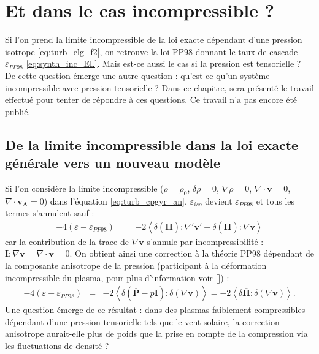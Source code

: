 \chapter{Et dans le cas incompressible ? }
\renewcommand\partie{\Partie\ Chapitre \thechapter}
\label{ch-22}

\bigskip
\minitoc  

Si l'on prend la limite incompressible de la loi exacte dépendant d'une pression isotrope \eqref{eq:turb_elg_f2}, on retrouve la loi \acs{PP98} donnant le taux de cascade $\varepsilon_{PP98}$ \eqref{eq:synth_inc_EL}. Mais est-ce aussi le cas si la pression est tensorielle ? De cette question émerge une autre question : qu'est-ce qu'un système incompressible avec pression tensorielle ? Dans ce chapitre, sera présenté le travail effectué pour tenter de répondre à ces questions. Ce travail n'a pas encore été publié. 

\section{De la limite incompressible dans la loi exacte générale vers un nouveau modèle }
\label{sec-221}

Si l'on considère la limite incompressible ($\rho = \rho_0$, $\delta \rho = 0$, $\nabla \rho=0$, $\nabla \cdot \boldsymbol{v}=0$, $\nabla \cdot \boldsymbol{v_A}=0$) dans l'équation \eqref{eq:turb_cpgyr_an}, $\varepsilon_{iso}$ devient $\varepsilon_{PP98}$ et tous les termes s'annulent sauf : 
\begin{eqnarray}
\label{eq:turb_cpinc_an} 
- 4(\varepsilon - \varepsilon_{PP98}) &=& -2 \left< \delta (\overline{\boldsymbol{\Pi}}):\nabla' \boldsymbol{v'} -   \delta (\overline{\boldsymbol{\Pi}} ) :\nabla  \boldsymbol{v}\right> 
\end{eqnarray}
car la contribution de la trace de $\nabla \boldsymbol{v}$ s'annule par incompressibilité : $\overline{\boldsymbol{I}} :\nabla \boldsymbol{v} = \nabla \cdot \boldsymbol{v}=0$. On obtient ainsi une correction à la théorie PP98 dépendant de la composante anisotrope de la pression (participant à la déformation incompressible du plasma, pour plus d'information voir [\cite{cassak_pressure-strain_2022}]) : 
\begin{equation}
\label{eq:turb_cpinc_gen} \boxed{
\begin{array}{lcl}
- 4(\varepsilon - \varepsilon_{PP98}) &=& -2 \left< \delta (\overline{\boldsymbol{P}} - p \overline{\boldsymbol{I}}):\delta (\nabla \boldsymbol{v}) \right> = -2 \left< \delta \overline{\boldsymbol{\Pi}} :\delta (\nabla \boldsymbol{v}) \right>.
\end{array}}
\end{equation}
Une question émerge de ce résultat : dans des plasmas faiblement compressibles dépendant d'une pression tensorielle tels que le vent solaire, la correction anisotrope aurait-elle plus de poids que la prise en compte de la compression via les fluctuations de densité ?

